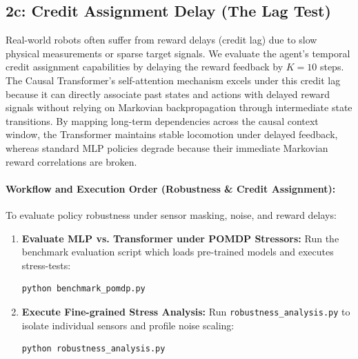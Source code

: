 \documentclass[11pt,a4paper]{article}
\begin{document}
\subsection{2c: Credit Assignment Delay (The Lag Test)}
Real-world robots often suffer from reward delays (credit lag) due to slow physical measurements or sparse target signals. We evaluate the agent's temporal credit assignment capabilities by delaying the reward feedback by $K=10$ steps. The Causal Transformer's self-attention mechanism excels under this credit lag because it can directly associate past states and actions with delayed reward signals without relying on Markovian backpropagation through intermediate state transitions. By mapping long-term dependencies across the causal context window, the Transformer maintains stable locomotion under delayed feedback, whereas standard MLP policies degrade because their immediate Markovian reward correlations are broken.

\begin{table}[!ht]
    \centering
    \caption{Stressor Ablation Rewards (Mean over 5 Evaluation Runs)}
    \label{tab:pomdp_ablation}
\end{table}

\paragraph{Workflow and Execution Order (Robustness \& Credit Assignment):}
To evaluate policy robustness under sensor masking, noise, and reward delays:
\begin{enumerate}
    \item \textbf{Evaluate MLP vs. Transformer under POMDP Stressors:} Run the benchmark evaluation script which loads pre-trained models and executes stress-tests:
    \begin{lstlisting}[language=bash]
    python benchmark_pomdp.py
    \end{lstlisting}
    \item \textbf{Execute Fine-grained Stress Analysis:} Run \texttt{robustness\_analysis.py} to isolate individual sensors and profile noise scaling:
    \begin{lstlisting}[language=bash]
    python robustness_analysis.py
    \end{lstlisting}
\end{enumerate}
\end{document}
